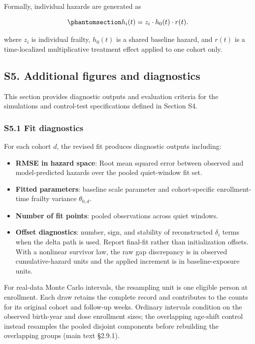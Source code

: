 \documentclass[
]{article}
\providecommand{\tightlist}{%
  \setlength{\itemsep}{0pt}\setlength{\parskip}{0pt}}
\begin{document}
Formally, individual hazards are generated as

\begin{equation}\protect\phantomsection\label{eq:si_individual_hazard_with_effect}{h_i(t) = z_i \cdot h_0(t) \cdot r(t).}\end{equation}

where \(z_i\) is individual frailty, \(h_0(t)\) is a shared baseline hazard, and \(r(t)\) is a time-localized multiplicative treatment effect applied to one cohort only.

\subsection{S5. Additional figures and diagnostics}\label{s5.-additional-figures-and-diagnostics}

This section provides diagnostic outputs and evaluation criteria for the simulations and control-test specifications defined in Section S4.

\subsubsection{S5.1 Fit diagnostics}\label{s5.1-fit-diagnostics}

For each cohort \(d\), the revised fit produces diagnostic outputs including:

\begin{itemize}
\tightlist
\item
  \textbf{RMSE in hazard space}: Root mean squared error between observed and model-predicted hazards over the pooled quiet-window fit set.
\item
  \textbf{Fitted parameters}: baseline scale parameter and cohort-specific enrollment-time frailty variance \(\theta_{0,d}\).
\item
  \textbf{Number of fit points}: pooled observations across quiet windows.
\item
  \textbf{Offset diagnostics}: number, sign, and stability of reconstructed \(\delta_i\) terms when the delta path is used. Report final-fit rather than initialization offsets. With a nonlinear survivor law, the raw gap discrepancy is in observed cumulative-hazard units and the applied increment is in baseline-exposure units.
\end{itemize}

For real-data Monte Carlo intervals, the resampling unit is one eligible person at enrollment. Each draw retains the complete record and contributes to the counts for its original cohort and follow-up weeks. Ordinary intervals condition on the observed birth-year and dose enrollment sizes; the overlapping age-shift control instead resamples the pooled disjoint components before rebuilding the overlapping groups (main text §2.9.1).
\end{document}
